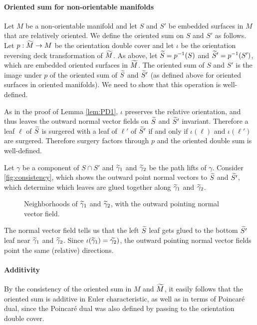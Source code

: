 \paragraph{Oriented sum for non-orientable manifolds}

Let $M$ be a non-orientable manifold and let $S$ and $S'$ be embedded surfaces in $M$ that are relatively oriented.
We define the oriented sum on $S$ and $S'$ as follows.
Let $p:\widetilde{M}\rightarrow M$ be the orientation double cover and let $\iota$ be the orientation reversing deck transformation of $\widetilde{M}$.
As above, let $\widetilde{S}=p^{-1}(S)$ and $\widetilde{S}'=p^{-1}(S')$, which are embedded oriented surfaces in $\widetilde{M}$.
The oriented sum of $S$ and $S'$ is the image under $p$ of the oriented sum of $\widetilde{S}$ and $\widetilde{S}'$ (as defined above for oriented surfaces in oriented manifolds).
We need to show that this operation is well-defined.

As in the proof of Lemma \ref{lem:PD1}, $\iota$ preserves the relative orientation, and thus leaves the outward normal vector fields on $\widetilde{S}$ and $\widetilde{S}'$ invariant.
Therefore a leaf $\ell$ of $\widetilde{S}$ is surgered with a leaf of $\ell'$ of $\widetilde{S}'$ if and only if $\iota(\ell)$ and $\iota(\ell')$ are surgered.
Therefore surgery factors through $p$ and the oriented double sum is well-defined.

\begin{example}
  Let $\gamma$ be a component of $S\cap S'$ and $\widetilde{\gamma}_1$ and $\widetilde{\gamma}_2$ be the path lifts of $\gamma$.
  Consider \autoref{fig:consistency}, which shows the outward point normal vectors to $\widetilde{S}$ and $\widetilde{S'}$, which determine which leaves are glued together along $\widetilde{\gamma}_1$ and $\widetilde{\gamma}_2$.

\begin{figure}
  \centering
  \caption{Neighborhoods of $\widetilde{\gamma}_1$ and $\widetilde{\gamma}_2$, with the outward pointing normal vector field.}
  \label{fig:consistency}
\end{figure}

The normal vector field tells us that the left $\widetilde{S}$ leaf gets glued to the bottom $\widetilde{S'}$ leaf near $\widetilde{\gamma}_1$ and $\widetilde{\gamma}_2$.
Since $\iota(\widetilde{\gamma}_1)=\widetilde{\gamma_2})$, the outward pointing normal vector fields point the same (relative) directions.
\end{example}

\paragraph{Additivity}

By the consistency of the oriented sum in $M$ and $\widetilde{M}$, it easily follows that the oriented sum is additive in Euler characteristic, as well as in terms of Poincar\'e dual, since the Poincar\'e dual was also defined by passing to the orientation double cover.
